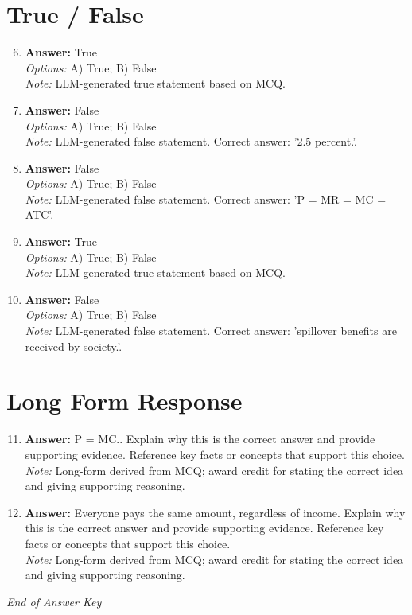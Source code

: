 \documentclass[12pt]{article}
\begin{document}
\section*{True / False}
\begin{enumerate}[label=\arabic*.]
\setcounter{enumi}{5}
\item \textbf{Answer:} True
\\ \textit{Options:} A) True; B) False
\\ \textit{Note:} LLM-generated true statement based on MCQ.
\item \textbf{Answer:} False
\\ \textit{Options:} A) True; B) False
\\ \textit{Note:} LLM-generated false statement. Correct answer: '2.5 percent.'.
\item \textbf{Answer:} False
\\ \textit{Options:} A) True; B) False
\\ \textit{Note:} LLM-generated false statement. Correct answer: 'P = MR = MC = ATC'.
\item \textbf{Answer:} True
\\ \textit{Options:} A) True; B) False
\\ \textit{Note:} LLM-generated true statement based on MCQ.
\item \textbf{Answer:} False
\\ \textit{Options:} A) True; B) False
\\ \textit{Note:} LLM-generated false statement. Correct answer: 'spillover benefits are received by society.'.
\end{enumerate}

\section*{Long Form Response}
\begin{enumerate}[label=\arabic*.]
\setcounter{enumi}{10}
\item \textbf{Answer:} P = MC.. Explain why this is the correct answer and provide supporting evidence. Reference key facts or concepts that support this choice.
\\ \textit{Note:} Long-form derived from MCQ; award credit for stating the correct idea and giving supporting reasoning.
\item \textbf{Answer:} Everyone pays the same amount, regardless of income. Explain why this is the correct answer and provide supporting evidence. Reference key facts or concepts that support this choice.
\\ \textit{Note:} Long-form derived from MCQ; award credit for stating the correct idea and giving supporting reasoning.
\end{enumerate}

\vfill
\noindent\textit{End of Answer Key}
\end{document}
